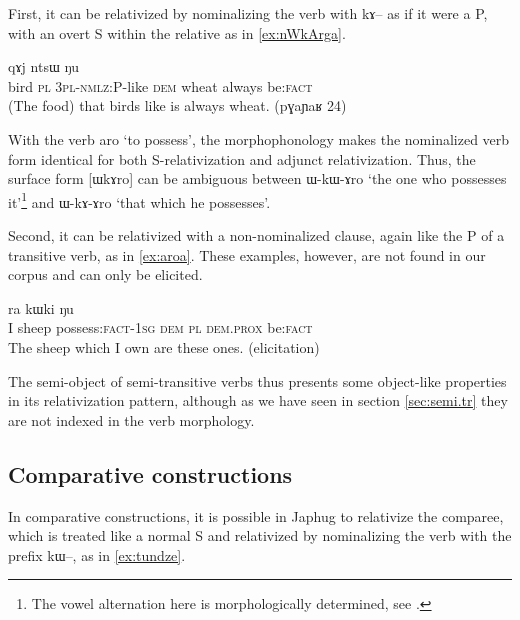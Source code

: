 \documentclass[oldfontcommands,oneside,a4paper,11pt]{article}
\newcommand{\ipa}[1]{{\phon #1}} %
\newcommand{\topic}{\textsc{dem}}
\begin{document}
First, it can be relativized by nominalizing the verb with \ipa{kɤ}-- as if it were a P, with an overt S within the relative as in \ref{ex:nWkArga}.


 \begin{exe}
   \ex   \label{ex:nWkArga}  
\gll [\ipa{pɣa}  	\ipa{ra}  	\ipa{nɯ-kɤ-rga}]  	\ipa{nɯ}  	\ipa{qɤj}  	\ipa{ntsɯ}  	\ipa{ŋu}  \\
bird \textsc{pl} \textsc{3pl-nmlz:P}-like \topic{} wheat always be:\textsc{fact} \\
\glt (The food) that birds like is always wheat. (pɣaɲaʁ 24)
   \end{exe} 

With the verb  \ipa{aro} `to possess', the morphophonology makes the nominalized verb form identical for both S-relativization and adjunct relativization. Thus, the surface form [ɯkɤro] can be ambiguous between \ipa{ɯ-kɯ-ɤro} `the one who possesses it'\footnote{The vowel alternation here is morphologically determined, see \citet{jacques07passif}.} and \ipa{ɯ-kɤ-ɤro} `that which he possesses'.

 Second, it can be relativized with a non-nominalized clause, again like the P of a transitive verb, as in \ref{ex:aroa}. These examples, however, are not found in our corpus and can only be elicited.
 \begin{exe}
   \ex   \label{ex:aroa}  
\gll
[\ipa{aʑo}  	\ipa{qaʑo}  	\ipa{aro-a}]  	\ipa{nɯ} \ipa{ra}  	\ipa{kɯki}  	\ipa{ŋu}  \\
I sheep possess:\textsc{fact}-\textsc{1sg} \topic{} \textsc{pl} \textsc{dem.prox} be:\textsc{fact} \\
\glt The sheep which I own are these ones. (elicitation)
   \end{exe} 



The semi-object of semi-transitive verbs thus presents some object-like properties in its relativization pattern, although as we have seen in section \ref{sec:semi.tr} they are not indexed in the verb morphology.


	\subsection{Comparative constructions} \label{sec:comparative}
In comparative constructions, it is possible in Japhug to relativize the comparee, which is treated like a normal S and relativized by nominalizing the verb with the prefix \ipa{kɯ}--, as in \ref{ex:tundze}.
\end{document}
